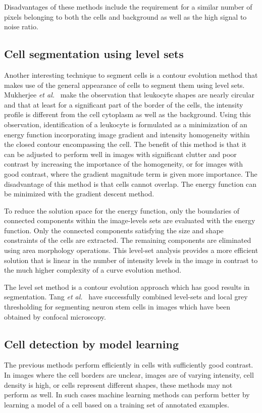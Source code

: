 Disadvantages of these methods include the requirement for a similar number of pixels belonging to both the cells and background as well as the high signal to noise ratio.

\subsection{Cell segmentation using level sets}

Another interesting technique to segment cells is a contour evolution method that makes use of the general appearance of cells to segment them using level sets. Mukherjee \emph{et al.}~\cite{mukherjee04} make the observation that leukocyte shapes are nearly circular and that at least for a significant part of the border of the cells, the intensity profile is different from the cell cytoplasm as well as the background. Using this observation, identification of a leukocyte is formulated as a minimization of an energy function incorporating image gradient and intensity homogeneity within the closed contour encompassing the cell. The benefit of this method is that it can be adjusted to perform well in images with significant clutter and poor contrast by increasing the importance of the homogeneity, or for images with good contrast, where the gradient magnitude term is given more importance. The disadvantage of this method is that cells cannot overlap. The energy function can be minimized with the gradient descent method.

To reduce the solution space for the energy function, only the boundaries of connected components within the image-levels sets are evaluated with the energy function. Only the connected components satisfying the size and shape constraints of the cells are extracted. The remaining components are eliminated using area morphology operations. This level-set analysis provides a more efficient solution that is linear in the number of intensity levels in the image in contrast to the much higher complexity of a curve evolution method.

The level set method is a contour evolution approach which has good results in segmentation. Tang \emph{et al.}~\cite{tang} have successfully combined level-sets and local grey thresholding \cite{xu10} for segmenting neuron stem cells in images which have been obtained by confocal microscopy.

\subsection{Cell detection by model learning}
The previous methods perform efficiently in cells with sufficiently good contrast. In images where the cell borders are unclear, images are of varying intensity, cell density is high, or cells represent different shapes, these methods may not perform as well. In such cases machine learning methods can perform better by learning a model of a cell based on a training set of annotated examples.

